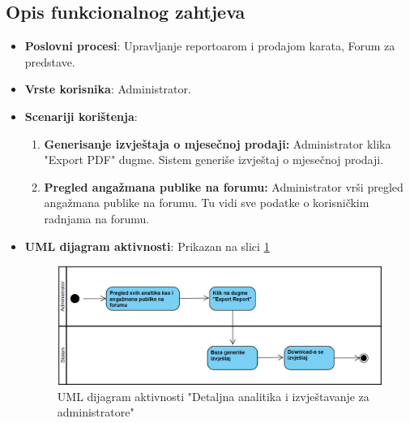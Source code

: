 \subsection{Opis funkcionalnog zahtjeva}  
\begin{itemize}  
    \item \textbf{Poslovni procesi}: Upravljanje reportoarom i prodajom karata, Forum za predstave.  
    \item \textbf{Vrste korisnika}: Administrator.  
    \item \textbf{Scenariji korištenja}:  
        \begin{enumerate}  
            \item \textbf{Generisanje izvještaja o mjesečnoj prodaji:} 
            Administrator klika "Export PDF" dugme. Sistem generiše izvještaj o mjesečnoj prodaji.  
            \item \textbf{Pregled angažmana publike na forumu:} Administrator vrši pregled angažmana publike na forumu. Tu vidi sve podatke o korisničkim radnjama na forumu.  
        \end{enumerate}  
    \item \textbf{UML dijagram aktivnosti}: Prikazan na slici \ref{fig:fz10_uml}  
    \begin{figure}[H]
        \centering
        \includegraphics[width=1\linewidth]{Slike/FZ10/fz10_uml.png}
        \caption{UML dijagram aktivnosti "Detaljna analitika i izvještavanje za administratore"}
        \label{fig:fz10_uml}
    \end{figure}
\end{itemize}  

\sloppy  
